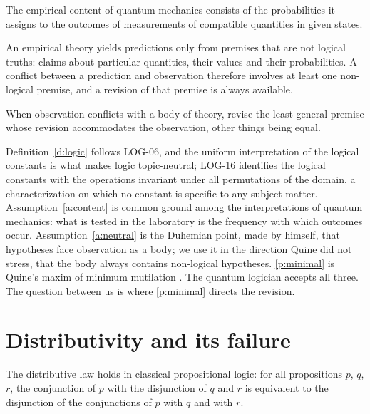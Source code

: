 \documentclass{situationist-preprint}
\begin{document}
\begin{assumption}\label{a:content}
The empirical content of quantum mechanics consists of the probabilities it assigns to the outcomes of measurements of compatible quantities in given states.
\end{assumption}

\begin{assumption}\label{a:neutral}
An empirical theory yields predictions only from premises that are not logical truths: claims about particular quantities, their values and their probabilities. A conflict between a prediction and observation therefore involves at least one non-logical premise, and a revision of that premise is always available.
\end{assumption}

\begin{principle}\label{p:minimal}
When observation conflicts with a body of theory, revise the least general premise whose revision accommodates the observation, other things being equal.
\end{principle}

Definition~\ref{d:logic} follows LOG-06, and the uniform interpretation of the logical constants is what makes logic topic-neutral; LOG-16 identifies the logical constants with the operations invariant under all permutations of the domain, a characterization on which no constant is specific to any subject matter. Assumption~\ref{a:content} is common ground among the interpretations of quantum mechanics: what is tested in the laboratory is the frequency with which outcomes occur. Assumption~\ref{a:neutral} is the Duhemian point, made by \citet{Quine1951} himself, that hypotheses face observation as a body; we use it in the direction Quine did not stress, that the body always contains non-logical hypotheses. \ref{p:minimal} is Quine's maxim of minimum mutilation \citep{Quine1970}. The quantum logician accepts all three. The question between us is where \ref{p:minimal} directs the revision.

\section{Distributivity and its failure}

\begin{theorem}\label{t:dist}
The distributive law holds in classical propositional logic: for all propositions $p$, $q$, $r$, the conjunction of $p$ with the disjunction of $q$ and $r$ is equivalent to the disjunction of the conjunctions of $p$ with $q$ and with $r$.
\end{theorem}
\end{document}
